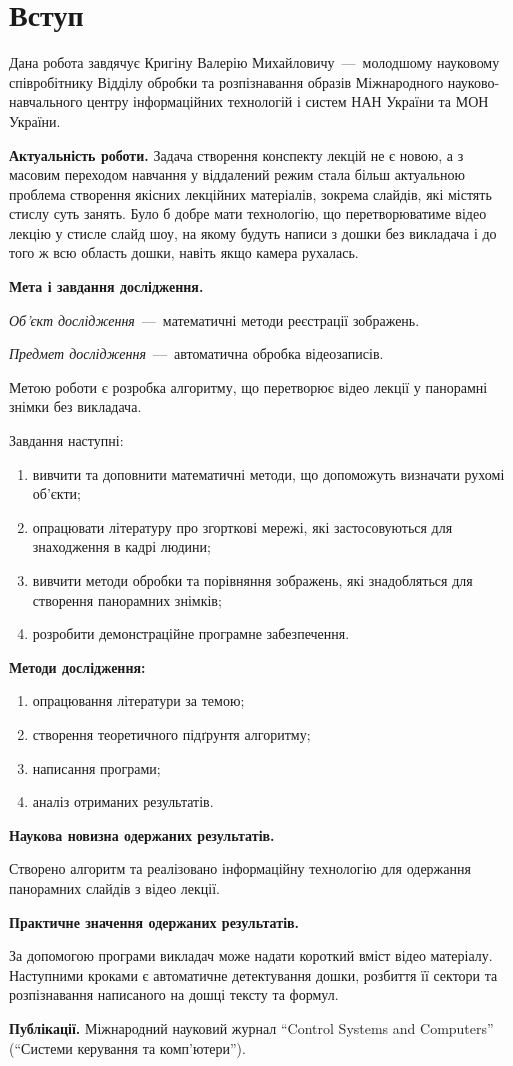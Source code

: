 \chapter*{Вступ}

Дана робота завдячує Кригіну Валерію Михайловичу~---~молодшому
науковому співробітнику Відділу обробки та розпізнавання
образів Міжнародного науково-навчального центру інформаційних
технологій і систем НАН України та МОН України.

\textbf{Актуальність роботи.}
Задача створення конспекту лекцій не є новою,
а з масовим переходом навчання у віддалений режим
стала більш актуальною проблема створення якісних
лекційних матеріалів, зокрема слайдів, які містять
стислу суть занять. Було б добре мати технологію, що
перетворюватиме відео лекцію у стисле слайд шоу, на
якому будуть написи з дошки без викладача і до того
ж всю область дошки, навіть якщо камера
рухалась.

\textbf{Мета і завдання дослідження.}

\textit{Об'єкт дослідження}~---~математичні методи
реєстрації зображень.

\textit{Предмет дослідження}~---~автоматична обробка
відеозаписів.

Метою роботи є розробка алгоритму, що перетворює відео
лекції у панорамні знімки без викладача.

Завдання наступні:
\begin{enumerate}
  \item
        вивчити та доповнити математичні методи,
        що допоможуть визначати рухомі об'єкти;
  \item
        опрацювати літературу про згорткові мережі, які застосовуються
        для знаходження в кадрі людини;
  \item
        вивчити методи обробки та порівняння зображень,
        які знадобляться для створення панорамних знімків;
  \item
        розробити демонстраційне програмне забезпечення.
\end{enumerate}

\textbf{Методи дослідження:}
\begin{enumerate}
  \item опрацювання літератури за темою;
  \item створення теоретичного підґрунтя алгоритму;
  \item написання програми;
  \item аналіз отриманих результатів.
\end{enumerate}

\textbf{Наукова новизна одержаних результатів.}

Створено алгоритм та реалізовано інформаційну технологію
для одержання панорамних слайдів з відео лекції.

\textbf{Практичне значення одержаних результатів.}

За допомогою програми викладач може надати короткий вміст
відео матеріалу. Наступними кроками є автоматичне детектування
дошки, розбиття її сектори та розпізнавання написаного на
дошці тексту та формул.

\textbf{Публікації.}
Міжнародний науковий журнал “Control Systems and Computers” 
(“Системи керування та комп'ютери”).
